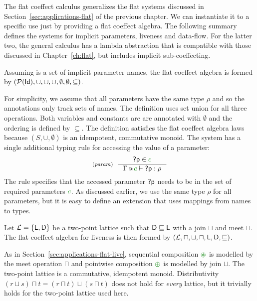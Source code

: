 The flat coeffect calculus generalizes the flat systems discussed in 
Section~\ref{sec:applications-flat} of the previous chapter. We can instantiate it to a specific
use just by providing a flat coeffect algebra. The following summary defines the systems for implicit 
parameters, liveness and data-flow. For the latter two, the general calculus has a lambda abstraction
that is compatible with those discussed in Chapter~\ref{ch:flat}, but includes implicit sub-coeffecting.

\begin{example}
Assuming  is a set of implicit parameter names, the flat coeffect algebra 
is formed by $(\mathcal{P}(\textnormal{\sffamily Id}), \cup, \cup, \cup, \emptyset, \emptyset, \subseteq)$.
\end{example}

\noindent
For simplicity, we assume that all parameters have the same type $\rho$ and so the annotations only
track sets of names. The definition uses set union for all three operations. Both variables and
constants are are annotated with $\emptyset$ and the ordering is defined by $\subseteq$. The 
definition satisfies the flat coeffect algebra laws because $(S, \cup, \emptyset)$ is an idempotent, 
commutative monoid. The system has a single additional typing rule for accessing the value of a
parameter:
%
\begin{equation*}
\tyrule{param}
  { \ident{?p} \in \cclrd{c} }
  { \coctx{\Gamma}{\cclrd{c}} \vdash \ident{?p} : \rho }
\end{equation*}
%
The rule specifies that the accessed parameter $\textnormal{\sffamily ?p}$ needs to be in the set of required
parameters $\cclrd{c}$. As discussed earlier, we use the same type $\rho$ for all parameters, but
it is easy to define an extension that uses mappings from names to types.

\begin{example}[Liveness]
Let $\mathcal{L}=\{ \ident{L}, \ident{D} \}$ be a two-point lattice such that $\textnormal{\sffamily D} \sqsubseteq \textnormal{\sffamily L}$
with a join $\sqcup$ and meet $\sqcap$. The flat coeffect algebra for liveness is then formed by
$(\mathcal{L}, \sqcap, \sqcup, \sqcap, \textnormal{\sffamily L}, \textnormal{\sffamily D}, \sqsubseteq)$.
\end{example}

\noindent
As in Section~\ref{sec:applications-flat-live}, sequential composition $\cseq$ is modelled by 
the meet operation $\sqcap$ and pointwise composition $\cpar$ is modelled by join $\sqcup$. 
The two-point lattice is a commutative, idempotent monoid. Distributivity 
$(r \sqcup s) \sqcap t = (r \sqcap t) \sqcup (s \sqcap t)$ does not hold for \emph{every} 
lattice, but it trivially holds for the two-point lattice used here.

